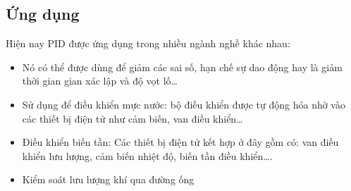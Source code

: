 \subsection{Ứng dụng}
\tab Hiện nay PID được ứng dụng trong nhiều ngành nghề khác nhau:
\begin{itemize}
    \item Nó có thể được dùng để giảm các sai số, hạn chế sự dao động hay là giảm thời gian gian xác lập và độ vọt lố…
    \item Sử dụng để điều khiển mực nước: bộ điều khiển được tự động hóa nhờ vào các thiết bị điện tử như cảm biến, van điều khiển…
    \item Điều khiển biến tần: Các thiết bị điện tử kết hợp ở đây gồm có: van điều khiển lưu lượng, cảm biến nhiệt độ, biến tần điều khiển….
    \item Kiểm soát lưu lượng khí qua đường ống
\end{itemize}